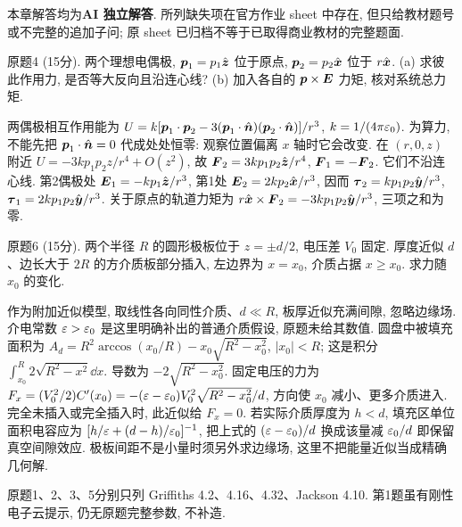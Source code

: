 本章解答均为\textbf{AI 独立解答}. 所列缺失项在官方作业 sheet 中存在, 但只给教材题号或不完整的追加子问; 原 sheet 已归档不等于已取得商业教材的完整题面.

\begin{exercise}
原题4 (15分). 两个理想电偶极, $\boldsymbol{p}_1=p_1\hat{\boldsymbol{z}}$ 位于原点, $\boldsymbol{p}_2=p_2\hat{\boldsymbol{x}}$ 位于 $r\hat{\boldsymbol{x}}$. (a) 求彼此作用力, 是否等大反向且沿连心线? (b) 加入各自的 $\boldsymbol{p}\times\boldsymbol{E}$ 力矩, 核对系统总力矩.
\end{exercise}
\begin{solution}
两偶极相互作用能为
$U=k[\boldsymbol{p}_1\cdot\boldsymbol{p}_2-3(\boldsymbol{p}_1\cdot\hat{\boldsymbol{n}})(\boldsymbol{p}_2\cdot\hat{\boldsymbol{n}})]/r^3$, $k=1/(4\pi\varepsilon_0)$. 为算力, 不能先把 $\boldsymbol{p}_1\cdot\hat{\boldsymbol{n}}=0$ 代成处处恒零: 观察位置偏离 $x$ 轴时它会改变. 在 $(r,0,z)$ 附近 $U=-3kp_1p_2z/r^4+O(z^2)$, 故 $\boldsymbol{F}_2=3kp_1p_2\hat{\boldsymbol{z}}/r^4$, $\boldsymbol{F}_1=-\boldsymbol{F}_2$. 它们不沿连心线. 第2偶极处 $\boldsymbol{E}_1=-kp_1\hat{\boldsymbol{z}}/r^3$, 第1处 $\boldsymbol{E}_2=2kp_2\hat{\boldsymbol{x}}/r^3$, 因而 $\boldsymbol{\tau}_2=kp_1p_2\hat{\boldsymbol{y}}/r^3$, $\boldsymbol{\tau}_1=2kp_1p_2\hat{\boldsymbol{y}}/r^3$. 关于原点的轨道力矩为 $r\hat{\boldsymbol{x}}\times\boldsymbol{F}_2=-3kp_1p_2\hat{\boldsymbol{y}}/r^3$, 三项之和为零.
\end{solution}
\begin{exercise}
原题6 (15分). 两个半径 $R$ 的圆形极板位于 $z=\pm d/2$, 电压差 $V_0$ 固定. 厚度近似 $d$、边长大于 $2R$ 的方介质板部分插入, 左边界为 $x=x_0$, 介质占据 $x\ge x_0$. 求力随 $x_0$ 的变化.
\end{exercise}
\begin{solution}
作为附加近似模型, 取线性各向同性介质、$d\ll R$, 板厚近似充满间隙, 忽略边缘场. 介电常数 $\varepsilon>\varepsilon_0$ 是这里明确补出的普通介质假设, 原题未给其数值. 圆盘中被填充面积为
$A_d=R^2\arccos(x_0/R)-x_0\sqrt{R^2-x_0^2}$, $|x_0|<R$; 这是积分 $\int_{x_0}^R2\sqrt{R^2-x^2}\dd x$. 导数为 $-2\sqrt{R^2-x_0^2}$. 固定电压的力为
$F_x=(V_0^2/2)C'(x_0)=-(\varepsilon-\varepsilon_0)V_0^2\sqrt{R^2-x_0^2}/d$, 方向使 $x_0$ 减小、更多介质进入. 完全未插入或完全插入时, 此近似给 $F_x=0$. 若实际介质厚度为 $h<d$, 填充区单位面积电容应为 $[h/\varepsilon+(d-h)/\varepsilon_0]^{-1}$, 把上式的 $(\varepsilon-\varepsilon_0)/d$ 换成该量减 $\varepsilon_0/d$ 即保留真空间隙效应. 极板间距不是小量时须另外求边缘场, 这里不把能量近似当成精确几何解.
\end{solution}
原题1、2、3、5分别只列 Griffiths 4.2、4.16、4.32、Jackson 4.10. 第1题虽有刚性电子云提示, 仍无原题完整参数, 不补造.

